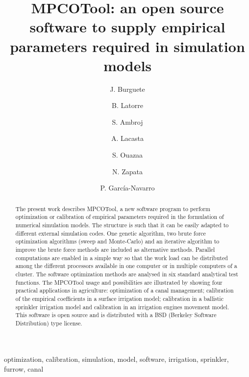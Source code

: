 \documentclass[review,authoryear]{elsarticle}
\begin{document}
\title{MPCOTool: an open source software to supply empirical parameters
required in simulation models}

\author[eead,bifi]{J. Burguete}

\author[eead]{B. Latorre}

\author[kit]{S. Ambroj}

\author[unizar]{A. Lacasta}

\author[eead]{S. Ouazaa}

\author[eead]{N. Zapata}

\author[unizar]{P. García-Navarro}


\address[eead]{Soil and Water, EEAD / CSIC.
P.O. Box 13034, 50080~Zaragoza, Spain.}
\address[bifi]{BIFI: Instituto de Biocomputación y Física de Sistemas Complejos,
Universidad de Zaragoza.
Mariano Esquillor, Edificio I+D, 50009~Zaragoza, Spain.}
\address[kit]{Steinbuch Centre for Computing (SCC),
Karlsruhe Institute of Technology (KIT).
KIT-Campus Nord, Hermann von Helmholtzplatz 1, 76344 Eggenstein - Leopoldshafen,
Germany.}
\address[unizar]{Fluid Mechanics, LIFTEC, CSIC-Universidad de Zaragoza.
María de Luna 3, 50018~Zaragoza, Spain.}

\begin{keyword}
optimization, calibration, simulation, model, software, irrigation, sprinkler,
furrow, canal
\end{keyword}

\begin{abstract}
The present work describes MPCOTool, a new software program to perform
optimization or calibration of empirical parameters required in the
formulation of numerical simulation models. The structure is such that it can be
easily adapted to different external simulation codes.
One genetic algorithm, two brute force optimization algorithms (sweep and
Monte-Carlo) and an iterative algorithm to improve the brute force methods are
included as alternative methods.
Parallel computations are enabled in a simple way so that the work load can be
distributed among the different processors available in one computer or in
multiple computers of a cluster.
The software optimization methods are analysed in six standard analytical test
functions.
The MPCOTool usage and possibilities are illustrated by showing four practical
applications in agriculture: optimization of a canal management; calibration of
the empirical coefficients in a surface irrigation model; calibration in a
ballistic sprinkler irrigation model and calibration in an irrigation engines
movement model.
This software is open source and is distributed with a BSD (Berkeley Software
Distribution) type license.
\end{abstract}
\end{document}
